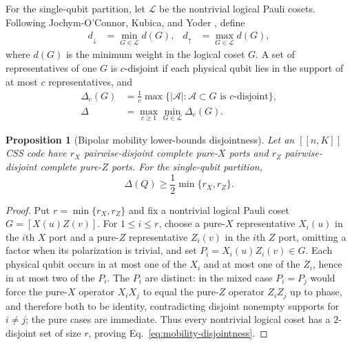 \documentclass[aps,prx,reprint,superscriptaddress,nofootinbib,floatfix,longbibliography]{revtex4-2}
\newtheorem{proposition}[theorem]{Proposition}
\theoremstyle{definition}
\begin{document}
For the single-qubit partition, let $\mathcal L$ be the nontrivial logical Pauli cosets.  Following Jochym-O'Connor, Kubica, and Yoder \cite{JochymDisjointness}, define
\begin{align}
 d_\downarrow&=\min_{G\in\mathcal L}d(G),&
 d_\uparrow&=\max_{G\in\mathcal L}d(G),
 \label{eq:minmax-distance}
\end{align}
where $d(G)$ is the minimum weight in the logical coset $G$.  A set of representatives of one $G$ is $c$-disjoint if each physical qubit lies in the support of at most $c$ representatives, and
\begin{align}
 \Delta_c(G)&=\frac{1}{c}\max\{|\mathcal A|:\mathcal A\subset G\text{ is $c$-disjoint}\},\nonumber\\
 \Delta&=\max_{c\ge1}\min_{G\in\mathcal L}\Delta_c(G).
 \label{eq:disjointness-def}
\end{align}

\begin{proposition}[Bipolar mobility lower-bounds disjointness]
\label{prop:mobility-disjointness}
Let an $[[n,K]]$ CSS code have $r_X$ pairwise-disjoint complete pure-$X$
ports and $r_Z$ pairwise-disjoint complete pure-$Z$ ports.  For the
single-qubit partition,
\begin{equation}
 \Delta(Q)\ge \frac12\min\{r_X,r_Z\}.
 \label{eq:mobility-disjointness}
\end{equation}
\end{proposition}

\begin{proof}
Put $r=\min\{r_X,r_Z\}$ and fix a nontrivial logical Pauli coset
$G=[X(u)Z(v)]$.  For $1\le i\le r$, choose a pure-$X$ representative
$X_i(u)$ in the $i$th $X$ port and a pure-$Z$ representative $Z_i(v)$ in
the $i$th $Z$ port, omitting a factor when its polarization is trivial, and
set $P_i=X_i(u)Z_i(v)\in G$.  Each physical qubit occurs in at most one of
the $X_i$ and at most one of the $Z_i$, hence in at most two of the $P_i$.
The $P_i$ are distinct: in the mixed case $P_i=P_j$ would force the pure-$X$
operator $X_iX_j$ to equal the pure-$Z$ operator $Z_iZ_j$ up to phase, and
therefore both to be identity, contradicting disjoint nonempty supports for
$i\ne j$; the pure cases are immediate.  Thus every nontrivial logical coset
has a $2$-disjoint set of size $r$, proving Eq.~\eqref{eq:mobility-disjointness}.
\end{proof}
\end{document}
